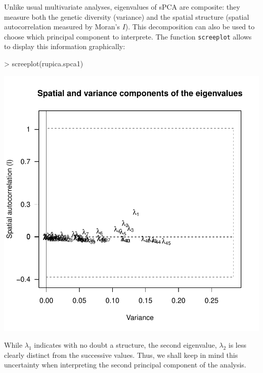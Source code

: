 \documentclass{article}
\begin{document}
Unlike usual multivariate analyses, eigenvalues of sPCA are composite:
they measure both the genetic diversity (variance) and the spatial
structure (spatial autocorrelation measured by Moran's $I$).
This decomposition can also be used to choose which principal
component to interprete.
The function \texttt{screeplot} allows to display this information graphically:
\begin{Schunk}
\begin{Sinput}
> screeplot(rupica.spca1)
\end{Sinput}
\end{Schunk}
\includegraphics{figs/spca-049}

\noindent While $\lambda_1$ indicates with no doubt a structure, the
second eigenvalue, $\lambda_2$ is less clearly distinct from the
successive values.
Thus, we shall keep in mind this uncertainty when interpreting the
second principal component of the analysis.
\\
\end{document}
